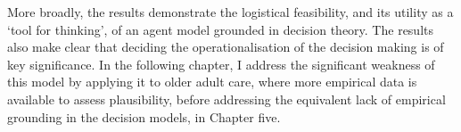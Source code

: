 More broadly, the results demonstrate the logistical feasibility, and its utility as a `tool for thinking', of an agent model grounded in decision theory. The results also make clear that deciding the operationalisation of the decision making is of key significance. In the following chapter, I address the significant weakness of this model by applying it to older adult care, where more empirical data is available to assess plausibility, before addressing the equivalent lack of empirical grounding in the decision models, in Chapter five.


